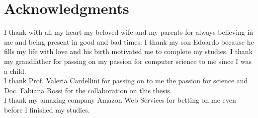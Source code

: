 \section*{Acknowledgments}
\label{sec:acknowledgments}

I thank with all my heart my beloved wife and my parents for always believing in me and being present in good and bad times.
I thank my son Edoardo because he fills my life with love and his birth motivated me to complete my studies.
I thank my grandfather for passing on my passion for computer science to me since I was a child.\\
I thank Prof. Valeria Cardellini for passing on to me the passion for science and Doc. Fabiana Rossi for the collaboration on this thesis.\\
I thank my amazing company Amazon Web Services for betting on me even before I finished my studies.